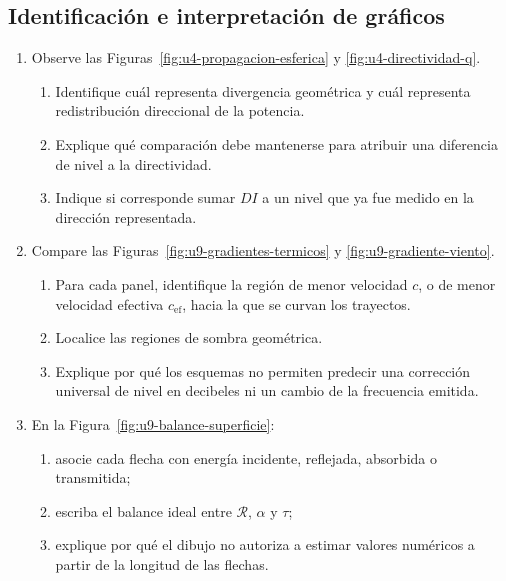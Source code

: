\subsection*{Identificación e interpretación de gráficos}

\begin{enumerate}[label=\textbf{V\arabic*.},leftmargin=*]
    \item Observe las Figuras~\ref{fig:u4-propagacion-esferica} y
    \ref{fig:u4-directividad-q}.
    \begin{enumerate}
        \item Identifique cuál representa divergencia geométrica y cuál
        representa redistribución direccional de la potencia.
        \item Explique qué comparación debe mantenerse para atribuir una
        diferencia de nivel a la directividad.
        \item Indique si corresponde sumar \(DI\) a un nivel que ya fue medido
        en la dirección representada.
    \end{enumerate}

    \item Compare las Figuras~\ref{fig:u9-gradientes-termicos} y
    \ref{fig:u9-gradiente-viento}.
    \begin{enumerate}
        \item Para cada panel, identifique la región de menor velocidad
        \(c\), o de menor velocidad efectiva \(c_\mathrm{ef}\), hacia la que
        se curvan los trayectos.
        \item Localice las regiones de sombra geométrica.
        \item Explique por qué los esquemas no permiten predecir una
        corrección universal de nivel en decibeles ni un cambio de la
        frecuencia emitida.
    \end{enumerate}

    \item En la Figura~\ref{fig:u9-balance-superficie}:
    \begin{enumerate}
        \item asocie cada flecha con energía incidente, reflejada, absorbida o
        transmitida;
        \item escriba el balance ideal entre
        \(\mathcal{R}\), \(\alpha\) y \(\tau\);
        \item explique por qué el dibujo no autoriza a estimar valores
        numéricos a partir de la longitud de las flechas.
    \end{enumerate}


\end{enumerate}
